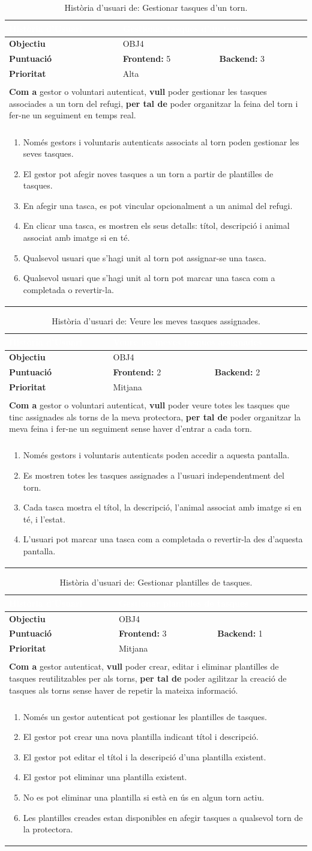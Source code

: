 \documentclass[11pt,a4paper]{report}
\newcommand{\HU}[9]{%
\begin{table}[H]\centering\footnotesize\renewcommand{\arraystretch}{1.1}%
\setlength{\extrarowheight}{0pt}%
\begin{tabular}{|l|p{4.8cm}|p{4.8cm}|}\hline
\rowcolor{oceanblue}\textcolor{white}{\textbf{Història d'Usuari}} & \multicolumn{2}{l|}{\textcolor{white}{#2}} \\\hline
\textbf{Objectiu} & \multicolumn{2}{l|}{#1} \\\hline
\rowcolor{gray!10}\textbf{Puntuació} & \textbf{Frontend: } #3 & \textbf{Backend: } #4 \\\hline
\textbf{Prioritat} & \multicolumn{2}{l|}{#5} \\\hline
\rowcolor{oceanblue}\multicolumn{3}{|l|}{\textcolor{white}{\textbf{Descripció}}} \\\hline
\multicolumn{3}{|p{12.5cm}|}{\textbf{Com a} #6, \textbf{vull} #7, \textbf{per tal de} #8.} \\\hline
\rowcolor{oceanblue}\multicolumn{3}{|l|}{\textcolor{white}{\textbf{Criteris d'Acceptació}}} \\\hline
\multicolumn{3}{|p{12.5cm}|}{\begin{enumerate}[leftmargin=0.4cm,topsep=0pt,parsep=0pt,itemsep=1pt,partopsep=0pt,after=\vspace{-3pt}] #9 \end{enumerate}} \\\hline
\end{tabular}\caption[HU: #2]{Història d'usuari de: #2.}\label{tab:hu_#1}\end{table}%
}
\begin{document}
    \HU{OBJ4}
    {Gestionar tasques d'un torn}
    {5}
    {3}
    {Alta}
    {gestor o voluntari autenticat}
    {poder gestionar les tasques associades a un torn del refugi}
    {poder organitzar la feina del torn i fer-ne un seguiment en temps real}
    {
        \item Només gestors i voluntaris autenticats associats al torn poden gestionar les seves tasques.
        \item El gestor pot afegir noves tasques a un torn a partir de plantilles de tasques.
        \item En afegir una tasca, es pot vincular opcionalment a un animal del refugi.
        \item En clicar una tasca, es mostren els seus detalls: títol, descripció i animal associat amb imatge si en té.
        \item Qualsevol usuari que s'hagi unit al torn pot assignar-se una tasca.
        \item Qualsevol usuari que s'hagi unit al torn pot marcar una tasca com a completada o revertir-la.
    }
    \HU{OBJ4}
    {Veure les meves tasques assignades}
    {2}
    {2}
    {Mitjana}
    {gestor o voluntari autenticat}
    {poder veure totes les tasques que tinc assignades als torns de la meva protectora}
    {poder organitzar la meva feina i fer-ne un seguiment sense haver d'entrar a cada torn}
    {
        \item Només gestors i voluntaris autenticats poden accedir a aquesta pantalla.
        \item Es mostren totes les tasques assignades a l'usuari independentment del torn.
        \item Cada tasca mostra el títol, la descripció, l'animal associat amb imatge si en té, i l'estat.
        \item L'usuari pot marcar una tasca com a completada o revertir-la des d'aquesta pantalla.
    }
    \HU{OBJ4}
    {Gestionar plantilles de tasques}
    {3}
    {1}
    {Mitjana}
    {gestor autenticat}
    {poder crear, editar i eliminar plantilles de tasques reutilitzables per als torns}
    {poder agilitzar la creació de tasques als torns sense haver de repetir la mateixa informació}
    {
        \item Només un gestor autenticat pot gestionar les plantilles de tasques.
        \item El gestor pot crear una nova plantilla indicant títol i descripció.
        \item El gestor pot editar el títol i la descripció d'una plantilla existent.
        \item El gestor pot eliminar una plantilla existent.
        \item No es pot eliminar una plantilla si està en ús en algun torn actiu.
        \item Les plantilles creades estan disponibles en afegir tasques a qualsevol torn de la protectora.
    }
\end{document}

